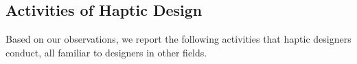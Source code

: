 \subsection{Activities of Haptic Design}
\noindent
Based on our observations, we report
%
the following activities that haptic designers conduct, all familiar to designers in other fields.



